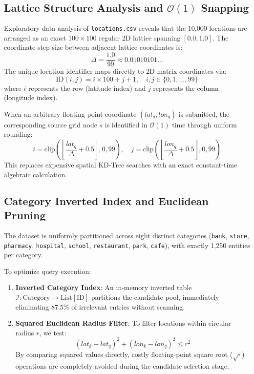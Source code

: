 \documentclass[11pt,a4paper]{article}
\begin{document}
\subsection{Lattice Structure Analysis and $\mathcal{O}(1)$ Snapping}
Exploratory data analysis of \texttt{locations.csv} reveals that the 10,000 locations are arranged as an exact $100 \times 100$ regular 2D lattice spanning $[0.0, 1.0]$. The coordinate step size between adjacent lattice coordinates is:
\begin{equation}
    \Delta = \frac{1.0}{99} \approx 0.01010101\dots
\end{equation}
The unique location identifier maps directly to 2D matrix coordinates via:
\begin{equation}
    \text{ID}(i, j) = i \times 100 + j + 1, \quad i, j \in \{0, 1, \dots, 99\}
\end{equation}
where $i$ represents the row (latitude index) and $j$ represents the column (longitude index).

When an arbitrary floating-point coordinate $(lat_q, lon_q)$ is submitted, the corresponding source grid node $s$ is identified in $\mathcal{O}(1)$ time through uniform rounding:
\begin{equation}
    i = \mathrm{clip}\left(\left\lfloor \frac{lat_q}{\Delta} + 0.5 \right\rfloor, 0, 99\right), \quad 
    j = \mathrm{clip}\left(\left\lfloor \frac{lon_q}{\Delta} + 0.5 \right\rfloor, 0, 99\right)
\end{equation}
This replaces expensive spatial KD-Tree searches with an exact constant-time algebraic calculation.

\subsection{Category Inverted Index and Euclidean Pruning}
The dataset is uniformly partitioned across eight distinct categories (\texttt{bank}, \texttt{store}, \texttt{pharmacy}, \texttt{hospital}, \texttt{school}, \texttt{restaurant}, \texttt{park}, \texttt{cafe}), with exactly 1,250 entities per category.

To optimize query execution:
\begin{enumerate}
    \item \textbf{Inverted Category Index}: An in-memory inverted table $\mathcal{I}: \text{Category} \to \text{List}[\text{ID}]$ partitions the candidate pool, immediately eliminating $87.5\%$ of irrelevant entries without scanning.
    \item \textbf{Squared Euclidean Radius Filter}: To filter locations within circular radius $r$, we test:
    \begin{equation}
        (lat_k - lat_q)^2 + (lon_k - lon_q)^2 \le r^2
    \end{equation}
    By comparing squared values directly, costly floating-point square root ($\sqrt{\cdot}$) operations are completely avoided during the candidate selection stage.
\end{enumerate}
\end{document}
